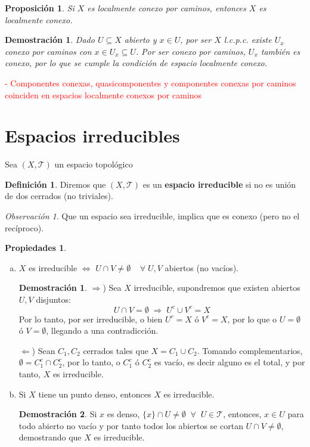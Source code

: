 \documentclass[12pt,twoside]{report}
\newcommand\mc[1]{\mathcal{#1}}
\theoremstyle{azul}
\newtheorem*{propx}{Proposición}
\newtheorem*{demx}{Demostración}
\theoremstyle{azul2}
\theoremstyle{plain}
\theoremstyle{definition}
\newtheorem*{defi}{Definición}
\newtheorem*{propi}{Propiedades}
\newtheorem*{dem}{Demostración}
\theoremstyle{remark}
\newtheorem*{obs}{Observación}
\begin{document}
\begin{propx}
Si $X$ es localmente conexo por caminos, entonces $X$ es localmente conexo.
\end{propx}
\begin{demx}
Dado $U \subseteq X$ abierto y $x \in U$, por ser $X$ l.c.p.c. existe $U_x$ conexo por caminos con $x \in U_x \subseteq U$. Por ser conexo por caminos, $U_x$ también es conexo, por lo que se cumple la condición de espacio localmente conexo.
\end{demx}

\textcolor{red}{- Componentes conexas, quasicomponentes y componentes conexas por caminos coinciden en espacios localmente conexos por caminos}

\section{Espacios irreducibles}
Sea $(X, \mc{T})$ un espacio topológico
\begin{defi}
Diremos que $(X, \mc{T})$ es un \textbf{espacio irreducible} si no es unión de dos cerrados (no triviales).  
\end{defi}
\begin{obs}
Que un espacio sea irreducible, implica que es conexo (pero no el recíproco).
\end{obs}
\begin{propi} \; \vspace{-3mm}
\begin{enumerate}[a)]
    \item $X$ es irreducible $\Leftrightarrow$ $U \cap V \neq \emptyset \; \; \; \; \forall \; U, V$ abiertos (no vacíos).
    \begin{dem} \;

    $\Rightarrow$) Sea $X$ irreducible, supondremos que existen abiertos $U,V$ disjuntos:
    $$U \cap V = \emptyset \; \Rightarrow \; U^c \cup V^c = X$$ 
    Por lo tanto, por ser irreducible, o bien $U^c = X$ ó $V^c = X$, por lo que o $U = \emptyset$ ó $V=\emptyset$, llegando a una contradicción.
    
    $\Leftarrow$) Sean  $C_1, C_2$ cerrados tales que $X = C_1 \cup C_2$. Tomando complementarios, $\emptyset = C_1^c \cap C_2^c$, por lo tanto, o $C_1^c$ ó $C_2^c$ es vacío, es decir alguno es el total, y por tanto, $X$ es irreducible.
    \end{dem}
    \item Si $X$ tiene un punto denso, entonces $X$ es irreducible.
    \begin{dem}
    Si $x$ es denso, $\{x\} \cap U \neq \emptyset \; \; \forall \; \; U \in \mc{T}$, entonces, $x \in U$ para todo abierto no vacío y por tanto todos los abiertos se cortan $U \cap V \neq \emptyset$, demostrando que $X$ es irreducible.
    \end{dem}
\end{enumerate}
\end{propi}
\end{document}
